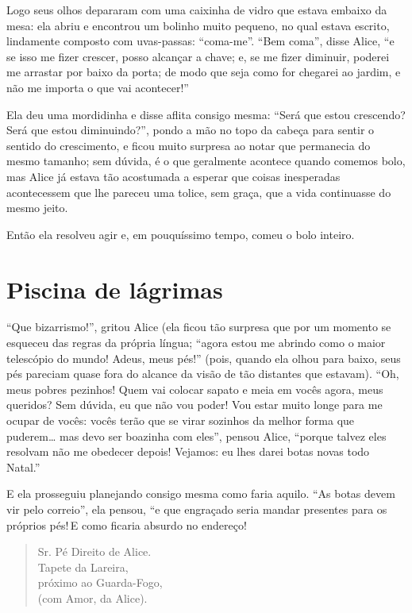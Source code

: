 Logo seus olhos depararam com uma caixinha de vidro que estava embaixo \label{ref3}
da mesa: ela abriu e encontrou um bolinho muito pequeno, no qual estava
escrito, lindamente composto com uvas-passas: ``coma-me''. ``Bem coma'',
disse Alice, ``e se isso me fizer crescer, posso alcançar a chave; e, se
me fizer diminuir, poderei me arrastar por baixo da porta; de modo que
seja como for chegarei ao jardim, e não me importa o que vai
acontecer!''

Ela deu uma mordidinha e disse aflita consigo mesma: ``Será que estou
crescendo? Será que estou diminuindo?'', pondo a mão no topo da cabeça
para sentir o sentido do crescimento, e ficou muito surpresa ao notar
que permanecia do mesmo tamanho; sem dúvida, é o que geralmente acontece
quando comemos bolo, mas Alice já estava tão acostumada a esperar que
coisas inesperadas acontecessem que lhe pareceu uma tolice, sem graça,
que a vida continuasse do mesmo jeito.

Então ela resolveu agir e, em pouquíssimo tempo, comeu o bolo inteiro.


\quebra\chapter{Piscina de lágrimas}

``Que bizarrismo!'', gritou Alice (ela ficou tão surpresa que por um
momento se esqueceu das regras da própria língua; ``agora estou me
abrindo como o maior telescópio do mundo! Adeus, meus pés!'' (pois,
quando ela olhou para baixo, seus pés pareciam quase fora do alcance da
visão de tão distantes que estavam). ``Oh, meus pobres pezinhos! Quem
vai colocar sapato e meia em vocês agora, meus queridos? Sem dúvida, eu
que não vou poder! Vou estar muito longe para me ocupar de vocês: vocês
terão que se virar sozinhos da melhor forma que puderem\ldots{} mas devo ser
boazinha com eles'', pensou Alice, ``porque talvez eles resolvam não me
obedecer depois! Vejamos: eu lhes darei botas novas todo Natal.''

E ela prosseguiu planejando consigo mesma como faria aquilo. ``As botas
devem vir pelo correio'', ela pensou, ``e que engraçado seria mandar
presentes para os próprios pés!\,E como ficaria absurdo no endereço!

\begin{quote}
Sr. Pé Direito de Alice.\\
Tapete da Lareira,\\
próximo ao Guarda-Fogo,\\
(com Amor, da Alice).
\end{quote}

